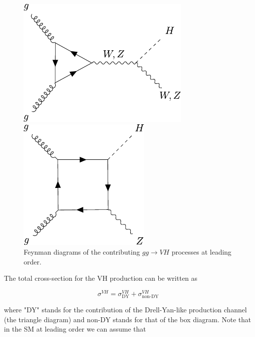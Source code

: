 \begin{figure}[h!]
	\centering
	\begin{minipage}{.5\textwidth}
		\centering
		\includegraphics[width=0.8\linewidth]{figures/theory/diagrams/ggVH_triangle.pdf}
	\end{minipage}%
	\begin{minipage}{.5\textwidth}
		\centering
		\includegraphics[width=0.6\linewidth]{figures/theory/diagrams/ggZH_box.pdf}
	\end{minipage}
	\caption{Feynman diagrams of the contributing $gg\rightarrow VH$ processes at leading order.}
	\label{fig:VH_diagrams}
\end{figure}

The total cross-section for the VH production can be written as

\begin{equation*}
	\sigma^{VH} = \sigma^{VH}_\text{DY} + \sigma^{VH}_\text{non-DY}
\end{equation*}

where "DY" stands for the contribution of the Drell-Yan-like production channel (the triangle diagram) and non-DY stands for that of the box diagram. Note that in the SM at leading order we can assume that

